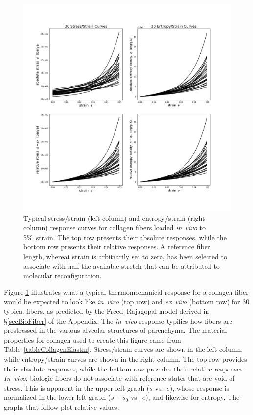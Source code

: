\begin{figure}
    \includegraphics[width=\textwidth]{figures/bioFibers5.jpg}
    \caption{Typical stress\slash strain (left column) and entropy\slash strain (right column) response curves for collagen fibers loaded \textit{in~vivo\/} to 5\%\ strain. The top row presents their absolute responses, while the bottom row presents their relative responses.  A reference fiber length, whereat strain is arbitrarily set to zero, has been selected to associate with half the available stretch that can be attributed to molecular reconfiguration.}
    \label{figCollagenFibersInVivo}
\end{figure}

Figure \ref{figCollagenFibersInVivo} illustrates what a typical thermomechanical response for a collagen fiber would be expected to look like \textit{in~vivo\/} (top row) and \textit{ex~vivo\/} (bottom row) for 30 typical fibers, as predicted by the Freed--Rajagopal \cite{FreedRajagopal16} model derived in \S\ref{secBioFiber} of the Appendix.  The \textit{in~vivo\/} response typifies how fibers are prestressed in the various alveolar structures of parenchyma.  The material properties for collagen used to create this figure came from Table~\ref{tableCollagenElastin}. Stress\slash strain curves are shown in the left column, while entropy\slash strain curves are shown in the right column.  The top row provides their absolute responses, while the bottom row provides their relative responses.  \textit{In~vivo}, biologic fibers do not associate with reference states that are void of stress.  This is apparent in the upper-left graph ($s$ vs.\ $e$), whose response is normalized in the lower-left graph ($s \! - \! s_0$ vs.\ $e$), and likewise for entropy.  The graphs that follow plot relative values.

